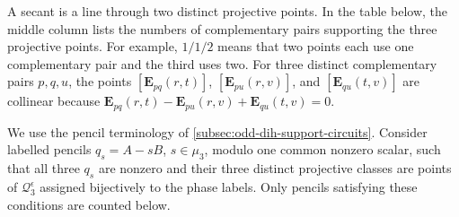 \documentclass[11pt,letterpaper,onecolumn]{article}
\theoremstyle{plain}
\theoremstyle{definition}
\theoremstyle{remark}
\begin{document}
A secant is a line through two distinct projective points.  In the table below, the middle column lists
	the numbers of complementary pairs supporting the three projective points.
	For example, \(1/1/2\) means that two points each use one complementary pair and the
	third uses two. For three distinct complementary pairs \(p,q,u\), the points
	\([{\mathbf E}_{pq}(r,t)]\), \([{\mathbf E}_{pu}(r,v)]\), and \([{\mathbf E}_{qu}(t,v)]\) are collinear
	because \({\mathbf E}_{pq}(r,t)-{\mathbf E}_{pu}(r,v)+{\mathbf E}_{qu}(t,v)=0\).
	
	We use the pencil terminology of \cref{subsec:odd-dih-support-circuits}.
	Consider labelled pencils \(q_s=A-sB\), \(s\in\mu_3\), modulo one common
	nonzero scalar, such that all three \(q_s\) are nonzero and their three
	distinct projective classes are points of \(\mathcal Q_3^\epsilon\)
	assigned bijectively to the phase labels.  Only pencils satisfying these
	conditions are counted below.
	
\end{document}
